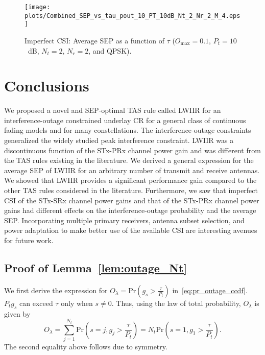\documentclass[12pt,draftcls,peerreview,onecolumn]{IEEEtran}
\newcommand{\brac}[1]{\left({#1}\right)}
\newcommand{\prob}[1]{\text{Pr}\brac{#1}}
\newcommand{\lam}{\lambda}
\newcommand{\Nt}{{N_t}}
\newcommand{\Nr}{{N_r}}
\newcommand{\Pt}{{P_t}}
\newcommand{\puch}{g}
\newcommand{\gk}[1]{{\puch_{#1}}}
\newcommand{\outmax}{O_{\text{max}}}
\newcommand{\itau}{\tau}
\newcommand{\out}{O}
\newcommand{\taubypt}{\frac{\itau}{\Pt}}
\newcommand{\gkgrtaubypt}[1]{{\gk{#1}}>\taubypt}
\newcommand{\outlam}{\out_{\lam}}
\begin{document}
\begin{figure}
	\centering \texttt{[image: plots/Combined\_SEP\_vs\_tau\_pout\_10\_PT\_10dB\_Nt\_2\_Nr\_2\_M\_4.eps]}
	\caption{Imperfect CSI: Average SEP as a function of $\itau$ ($\outmax=0.1$, $\Pt = 10$~dB, $\Nt = 2$, $\Nr = 2$, and QPSK).}
	\label{fig:sep_vs_tau_imp_CSI}
\end{figure}




\section{Conclusions}
\label{sec:conclusions}
We proposed a novel and SEP-optimal TAS rule called LWIIR for an interference-outage constrained underlay CR for a general class of continuous fading models and for many constellations. The interference-outage constraints generalized the widely studied peak interference constraint. LWIIR was a discontinuous function of the STx-PRx channel power gain and was different from the TAS rules existing in the literature. We derived a general expression for the average SEP of LWIIR for an arbitrary number of transmit and receive antennas. We showed that LWIIR provides a significant performance gain compared to the other TAS rules considered in the literature. Furthermore, we saw that imperfect CSI of the STx-SRx channel power gains and that of the STx-PRx channel power gains had different effects on the interference-outage probability and the average SEP.  Incorporating multiple primary receivers, antenna subset selection, and power adaptation to make better use of the available CSI are interesting avenues for future work.

\appendix
\subsection{Proof of Lemma~\ref{lem:outage_Nt}}
\label{proof:outage_Nt}
We first derive the expression for $\outlam = \prob{\gkgrtaubypt{s}}$ in~\eqref{eq:pr_outage_ccdf}. $\Pt \gk{s}$ can exceed  $\itau$ only when $s\neq0$. Thus, using the law of total probability, $\outlam$ is given by
%
\newcommand{\eqidx}{j}
\begin{equation}
\outlam =  \sum_{\eqidx=1}^{\Nt}\text{Pr}\brac{s=\eqidx,\gk{\eqidx}>\taubypt}=\Nt\text{Pr}\brac{s=1,\gk{1}>\taubypt}.
\label{eq:out_1}
\end{equation}
%
The second equality above follows due to symmetry.
\end{document}
